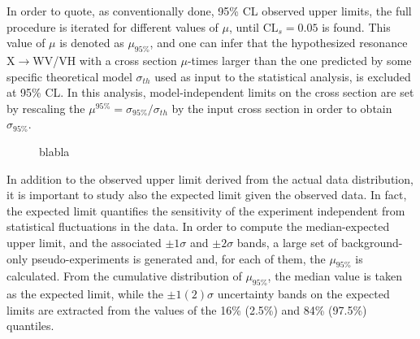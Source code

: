 In order to quote, as conventionally done, 95\% CL observed upper limits, the full procedure is iterated for different values of $\mu$, until $\mathrm{CL}_s = 0.05$ is found.
This value of $\mu$ is denoted as $\mu_{95\%}$, and one can infer that the hypothesized resonance X$\rightarrow$WV/VH with a cross section $\mu$-times larger than the one predicted 
by some specific theoretical model $\sigma_{th}$ used as input to the statistical analysis, is excluded at 95\% CL.
In this analysis, model-independent limits on the cross section are set by rescaling the $\mu^{95\%} = \sigma_{95\%}/\sigma_{th}$ by the input cross section in order to obtain $\sigma_{95\%}$.

\begin{figure}[!htb]
\centering
{}
\caption{blabla}
\label{fig:CLs-ex}
\end{figure}

In addition to the observed upper limit derived from the actual data distribution, it is important to study also the expected limit given the observed data.
In fact, the expected limit quantifies the sensitivity of the experiment independent from statistical fluctuations in the data.
In order to compute the median-expected upper limit, and the associated $\pm 1\sigma$ and $\pm 2\sigma$ bands,
a large set of background-only pseudo-experiments is generated and, for each of them, the $\mu_{95\%}$ is calculated.
From the cumulative distribution of $\mu_{95\%}$, the median value is taken as the expected limit, while the $\pm 1(2)\sigma$ uncertainty bands on the expected limits
are extracted from the values of the 16\% (2.5\%) and 84\% (97.5\%) quantiles.

